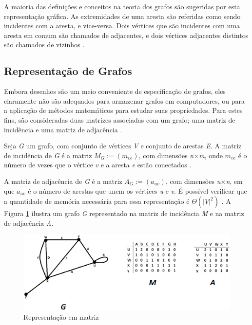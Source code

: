 A maioria das definições e conceitos na teoria dos grafos são sugeridas por esta representação gráfica. As extremidades de uma aresta são referidas como sendo incidentes com a aresta, e vice-versa. Dois vértices que são incidentes com uma aresta em comum são chamados de adjacentes, e dois vértices adjacentes distintos são chamados de vizinhos \cite{Costa:2011}.

\subsection{Representação de Grafos}

Embora desenhos são um meio conveniente de especificação de grafos, eles claramente não são adequados para armazenar grafos em computadores, ou para a aplicação de métodos matemáticos para estudar suas propriedades. Para estes fins, são consideradas duas matrizes associadas com um grafo; uma matriz de incidência e uma matriz de adjacência \cite{Bondy:2007}.

Seja \textit{G} um grafo, com conjunto de vértices \textit{V} e conjunto de arestas \textit{E}. A matriz de incidência de \textit{G} é a matriz $M_G:= (m_{ve})$, com dimensões \textit{n$\times$m}, onde $m_{ve}$ é o número de vezes que o vértice \textit{v} e a aresta \textit{e} estão conectados \cite{Bondy:2007}.

A matriz de adjacência de \textit{G} é a matriz $A_G := (a_{uv})$, com dimensões \textit{n$\times$n}, em que $a_{uv}$ é o número de arestas que unem os vértices \textit{u} e \textit{v}. É possível verificar que a quantidade de memória necessária para essa representação é $\Theta(|\textit{V}|^2)$ \cite{Bondy:2007}. A Figura \ref{matriz} ilustra um grafo \textit{G} representado na matriz de incidência \textit{M} e na matriz de adjacência \textit{A}.

\begin{figure}[!h]
	\centering
	\includegraphics[scale=0.45]{figuras/capitulo2/matriz.eps}
	\caption[Representação em matriz]{Representação em matriz \cite{Bondy:2007}}
	\label{matriz}
\end{figure}


